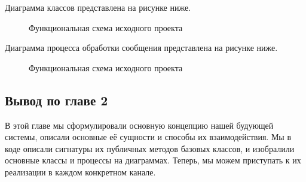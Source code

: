     Диаграмма классов представлена на рисунке ниже.
    \begin{figure}[!h]
        \centering
        \caption{Функциональная схема исходного проекта}
        \label{fig:func-schema-before}
    \end{figure}

    Диаграмма процесса обработки сообщения представлена на рисунке ниже.
    \begin{figure}[!h]
        \centering
        \caption{Функциональная схема исходного проекта}
        \label{fig:func-schema-before}
    \end{figure}

    \subsection*{Вывод по главе 2}
    В этой главе мы сформулировали основную концепцию нашей будующей системы, описали основные
    её сущности и способы их взаимодействия. Мы в коде описали сигнатуры их публичных методов базовых
    классов, и изобралили основные классы и процессы на диаграммах.
    Теперь, мы можем приступать к их реализации в каждом конкретном канале.
